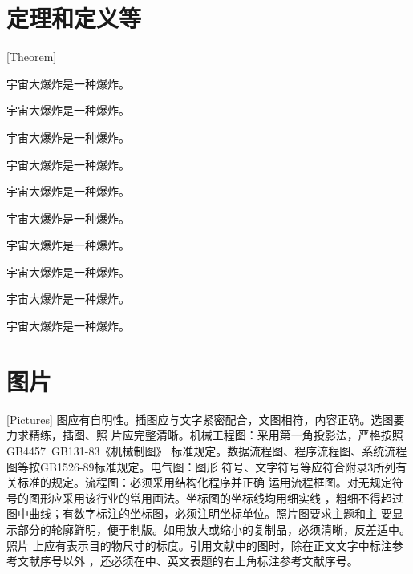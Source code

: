 \section{定理和定义等}[Theorem]
\begin{theorem}
宇宙大爆炸是一种爆炸。
\end{theorem}
\begin{definition}[（霍金）]
宇宙大爆炸是一种爆炸。
\end{definition}
\begin{assumption}
宇宙大爆炸是一种爆炸。
\end{assumption}
\begin{lemma}
宇宙大爆炸是一种爆炸。
\end{lemma}
\begin{corollary}
宇宙大爆炸是一种爆炸。
\end{corollary}
\begin{exercise}
宇宙大爆炸是一种爆炸。
\end{exercise}
\begin{problem}
宇宙大爆炸是一种爆炸。
\end{problem}
\begin{remark}
宇宙大爆炸是一种爆炸。
\end{remark}
\begin{axiom}[（爱因斯坦）]
宇宙大爆炸是一种爆炸。
\end{axiom}
\begin{conjecture}
宇宙大爆炸是一种爆炸。
\end{conjecture}
\section{图片}[Pictures]
图应有自明性。插图应与文字紧密配合，文图相符，内容正确。选图要力求精练，插图、照
片应完整清晰。机械工程图：采用第一角投影法，严格按照GB4457~GB131-83《机械制图》
标准规定。数据流程图、程序流程图、系统流程图等按GB1526-89标准规定。电气图：图形
符号、文字符号等应符合附录3所列有关标准的规定。流程图：必须采用结构化程序并正确
运用流程框图。对无规定符号的图形应采用该行业的常用画法。坐标图的坐标线均用细实线
，粗细不得超过图中曲线；有数字标注的坐标图，必须注明坐标单位。照片图要求主题和主
要显示部分的轮廓鲜明，便于制版。如用放大或缩小的复制品，必须清晰，反差适中。照片
上应有表示目的物尺寸的标度。引用文献中的图时，除在正文文字中标注参考文献序号以外
，还必须在中、英文表题的右上角标注参考文献序号。

